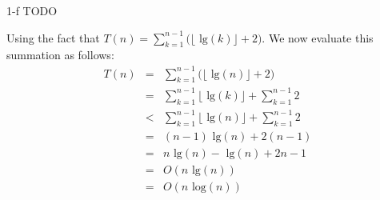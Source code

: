 \documentclass[11pt]{article}
\newcommand{\tlg}{\text{ lg}}
\newcommand{\tlog}{\text{ log}}
\begin{document}
\begin{prob}{1-f}
TODO
\end{prob}
\begin{sol}
Using the fact that $T(n) = \sum_{k=1}^{n-1}\big(\lfloor\tlg(k)\rfloor + 2\big)$. We now evaluate this summation as follows:
\begin{eqnarray*}
T(n) & = & \sum_{k=1}^{n-1}\big(\lfloor\tlg(n)\rfloor + 2\big) \\ 
& = & \sum_{k=1}^{n-1}\lfloor\tlg(k)\rfloor + \sum_{k=1}^{n-1}2 \\
& < & \sum_{k=1}^{n-1}\lfloor\tlg(n)\rfloor + \sum_{k=1}^{n-1}2 \\
& = & (n-1)\tlg(n) + 2(n-1) \\
& = & n\tlg(n) - \tlg(n) + 2n - 1 \\
& = & O(n\tlg(n)) \\
& = & O(n\tlog(n))
\end{eqnarray*}
\end{sol}
\end{document}
